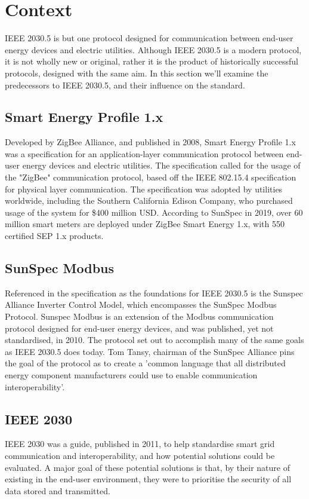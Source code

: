 \chapter{Context}\label{ch:context}

IEEE 2030.5 is but one protocol designed for communication between end-user energy devices and electric utilities. 
Although IEEE 2030.5 is a modern protocol, it is not wholly new or original, rather it is the product of historically successful protocols, designed with the same aim.
In this section we'll examine the predecessors to IEEE 2030.5, and their influence on the standard.

\section{Smart Energy Profile 1.x}
Developed by ZigBee Alliance, and published in 2008, Smart Energy Profile 1.x was a specification for an application-layer communication protocol between end-user energy devices and electric utilities. 
The specification called for the usage of the "ZigBee" communication protocol, based off the IEEE 802.15.4 specification for physical layer communication. \cite[]{ZigBeeSEP} \hfill \break
The specification was adopted by utilities worldwide, including the Southern California Edison Company, who purchased usage of the system for \$400 million USD.\cite[]{SEP1Article} \hfill \break
According to SunSpec in 2019, over 60 million smart meters are deployed under ZigBee Smart Energy 1.x, with 550 certified SEP 1.x products. \cite[]{20305workshop}


\section{SunSpec Modbus}
Referenced in the specification as the foundations for IEEE 2030.5 is the Sunspec Alliance Inverter Control Model, which encompasses the SunSpec Modbus Protocol.
Sunspec Modbus is an extension of the Modbus communication protocol designed for end-user energy devices, and was published, yet not standardised, in 2010. The protocol set out to accomplish many of the same goals as IEEE 2030.5 does today. 
Tom Tansy, chairman of the SunSpec Alliance pins the goal of the protocol as to create a 'common language that all distributed energy component manufacturers could use to enable communication interoperability'.
\cite[]{SunspecModbusArticle}

\section{IEEE 2030}
IEEE 2030 was a guide, published in 2011, to help standardise smart grid communication and interoperability, and how potential solutions could be evaluated. A major goal of these potential solutions is that, by their nature of existing in the end-user environment, they were to prioritise the security of all data stored and transmitted.
\cite[]{2030} 

